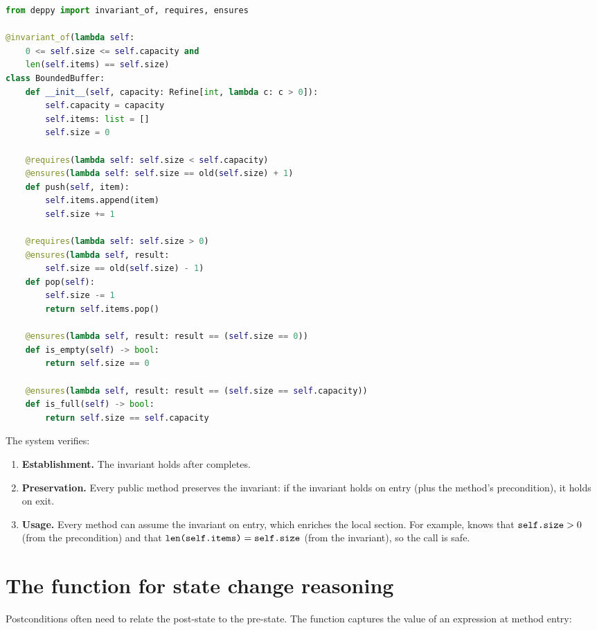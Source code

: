 \documentclass[11pt]{report}
\DeclareRobustCommand{\py}[1]{\texttt{\detokenize{#1}}}
\theoremstyle{definition}
\theoremstyle{plain}
\begin{document}
\begin{lstlisting}[style=deppy,language=Python]
from deppy import invariant_of, requires, ensures

@invariant_of(lambda self:
    0 <= self.size <= self.capacity and
    len(self.items) == self.size)
class BoundedBuffer:
    def __init__(self, capacity: Refine[int, lambda c: c > 0]):
        self.capacity = capacity
        self.items: list = []
        self.size = 0

    @requires(lambda self: self.size < self.capacity)
    @ensures(lambda self: self.size == old(self.size) + 1)
    def push(self, item):
        self.items.append(item)
        self.size += 1

    @requires(lambda self: self.size > 0)
    @ensures(lambda self, result:
        self.size == old(self.size) - 1)
    def pop(self):
        self.size -= 1
        return self.items.pop()

    @ensures(lambda self, result: result == (self.size == 0))
    def is_empty(self) -> bool:
        return self.size == 0

    @ensures(lambda self, result: result == (self.size == self.capacity))
    def is_full(self) -> bool:
        return self.size == self.capacity
\end{lstlisting}

The system verifies:
\begin{enumerate}[nosep]
  \item \textbf{Establishment.} The invariant holds after \py{__init__}
        completes.
  \item \textbf{Preservation.} Every public method preserves the invariant:
        if the invariant holds on entry (plus the method's precondition),
        it holds on exit.
  \item \textbf{Usage.} Every method can assume the invariant on entry, which
        enriches the local section. For example, \py{pop} knows that
        $\py{self.size} > 0$ (from the precondition) and that
        $\py{len(self.items)} = \py{self.size}$ (from the invariant), so the
        \py{self.items.pop()} call is safe.
\end{enumerate}

\section{The \py{old()} function for state change reasoning}

Postconditions often need to relate the post-state to the pre-state. The
\py{old(expr)} function captures the value of an expression at method entry:
\end{document}

